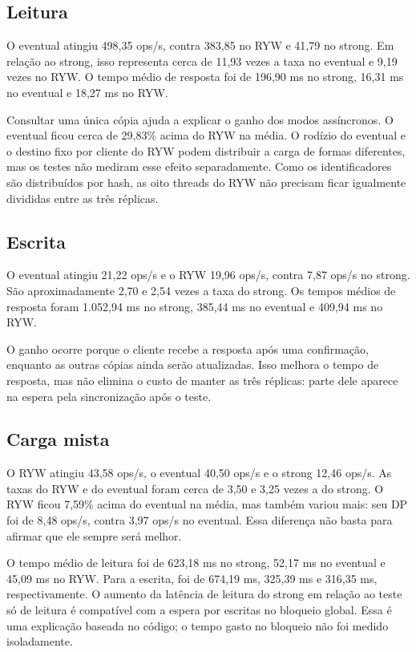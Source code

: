 \subsection{Leitura}
O eventual atingiu 498,35 ops/s, contra 383,85 no RYW e 41,79 no strong.
Em relação ao strong, isso representa cerca de 11,93 vezes a taxa no eventual
e 9,19 vezes no RYW. O tempo médio de resposta foi de 196,90 ms no strong,
16,31 ms no eventual e 18,27 ms no RYW.

Consultar uma única cópia ajuda a explicar o ganho dos modos assíncronos.
O eventual ficou cerca de 29,83\% acima do RYW na média. O rodízio do eventual
e o destino fixo por cliente do RYW podem distribuir a carga de formas
diferentes, mas os testes não mediram esse efeito separadamente. Como os
identificadores são distribuídos por hash, as oito threads do RYW não precisam
ficar igualmente divididas entre as três réplicas.

\subsection{Escrita}
O eventual atingiu 21,22 ops/s e o RYW 19,96 ops/s, contra 7,87 ops/s no strong.
São aproximadamente 2,70 e 2,54 vezes a taxa do strong. Os tempos médios
de resposta foram 1.052,94 ms no strong, 385,44 ms no eventual e 409,94 ms no RYW.

O ganho ocorre porque o cliente recebe a resposta após uma confirmação,
enquanto as outras cópias ainda serão atualizadas. Isso melhora o tempo de
resposta, mas não elimina o custo de manter as três réplicas: parte dele
aparece na espera pela sincronização após o teste.

\subsection{Carga mista}
O RYW atingiu 43,58 ops/s, o eventual 40,50 ops/s e o strong 12,46 ops/s.
As taxas do RYW e do eventual foram cerca de 3,50 e 3,25 vezes a do strong.
O RYW ficou 7,59\% acima do eventual na média, mas também variou mais:
seu DP foi de 8,48 ops/s, contra 3,97 ops/s no eventual. Essa diferença
não basta para afirmar que ele sempre será melhor.

O tempo médio de leitura foi de 623,18 ms no strong, 52,17 ms no eventual
e 45,09 ms no RYW. Para a escrita, foi de 674,19 ms, 325,39 ms e 316,35 ms,
respectivamente. O aumento da latência de leitura do strong em relação ao
teste só de leitura é compatível com a espera por escritas no bloqueio global.
Essa é uma explicação baseada no código; o tempo gasto no bloqueio não foi
medido isoladamente.


